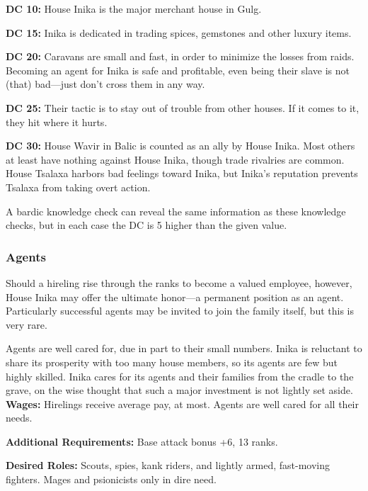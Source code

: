 \textbf{DC 10:} House Inika is the major merchant house in Gulg.

\textbf{DC 15:} Inika is dedicated in trading spices, gemstones and other luxury items.

\textbf{DC 20:} Caravans are small and fast, in order to minimize the losses from raids. Becoming an agent for Inika is safe and profitable, even being their slave is not (that) bad---just don't cross them in any way.

\textbf{DC 25:} Their tactic is to stay out of trouble from other houses.  If it comes to it, they hit where it hurts. 

\textbf{DC 30:} House Wavir in Balic is counted as an ally by House Inika. Most others at least have nothing against House Inika, though trade rivalries are common. House Tsalaxa harbors bad feelings toward Inika, but Inika's reputation prevents Tsalaxa from taking overt action.

A bardic knowledge check can reveal the same information as these knowledge checks, but in each case the DC is 5 higher than the given value.

\subsubsection{Agents}
Should a hireling rise through the ranks to become a valued employee, however, House Inika may offer the ultimate honor---a permanent position as an agent. Particularly successful agents may be invited to join the family itself, but this is very rare.

Agents are well cared for, due in part to their small numbers. Inika is reluctant to share its prosperity with too many house members, so its agents are few but highly skilled. Inika cares for its agents and their families from the cradle to the grave, on the wise thought that such a major investment is not lightly set aside.
\textbf{Wages:} Hirelings receive average pay, at most. Agents are well cared for all their needs.

\textbf{Additional Requirements:} Base attack bonus +6,  13 ranks.

\textbf{Desired Roles:} Scouts, spies, kank riders, and lightly armed, fast-moving fighters. Mages and psionicists only in dire need.